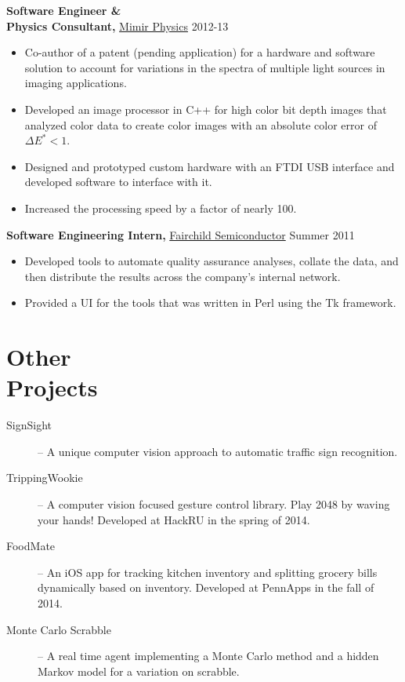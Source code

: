 \documentclass[margin]{res}
\begin{document}
\begin{minipage}{\textwidth}
\begin{resume}
{\bf Software Engineer \& \\ Physics Consultant,} \uline{Mimir Physics} \hfill 2012-13
 \begin{itemize} \itemsep -2pt  %
 \item Co-author of a patent (pending application) for a hardware and software solution to account for variations in the spectra of multiple light sources in imaging applications.
 \item Developed an image processor in C++ for high color bit depth images that analyzed color data to create color images with an absolute color error of $\Delta E^* < 1$.
 \item Designed and prototyped custom hardware with an FTDI USB interface  and developed software to interface with it.
 \item Increased the processing speed by a factor of nearly 100.
 \end{itemize}

 
 
{\bf Software Engineering Intern,} \uline{Fairchild Semiconductor} \hfill  Summer 2011
\begin{itemize} \itemsep -2pt %
 \item Developed tools to automate quality assurance analyses, collate the data, and then distribute the results across the company's internal network.
 \item Provided a UI for the tools that was written in Perl using the Tk framework.
\end{itemize}

\section{Other \\ Projects}
\begin{description}
	\item[SignSight] --
		A unique computer vision approach to automatic traffic sign recognition.
	\item[TrippingWookie] --
		A computer vision focused gesture control library. Play 2048 by waving your hands! Developed at HackRU in the spring of 2014.
	\item[FoodMate] --
		An iOS app for tracking kitchen inventory and splitting grocery bills dynamically based on inventory. Developed at PennApps in the fall of 2014.
	\item[Monte Carlo Scrabble] --
		A real time agent implementing a Monte Carlo method and a hidden Markov model for a variation on scrabble.
\end{description}


\end{resume}
\end{minipage}
\end{document}
